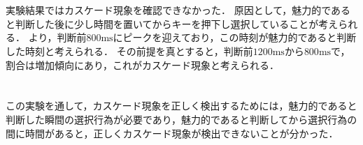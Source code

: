 \section{\consideration}
実験結果ではカスケード現象を確認できなかった．
原因として，魅力的であると判断した後に少し時間を置いてからキーを押下し選択していることが考えられる．
より，判断前\(800\textrm{ms}\)にピークを迎えており，この時刻が魅力的であると判断した時刻と考えられる．
その前提を真とすると，判断前\(1200\textrm{ms}\)から\(800\textrm{ms}\)で，割合は増加傾向にあり，これがカスケード現象と考えられる．
\section{\conclusion}
この実験を通して，カスケード現象を正しく検出するためには，魅力的であると判断した瞬間の選択行為が必要であり，魅力的であると判断してから選択行為の間に時間があると，正しくカスケード現象が検出できないことが分かった．
